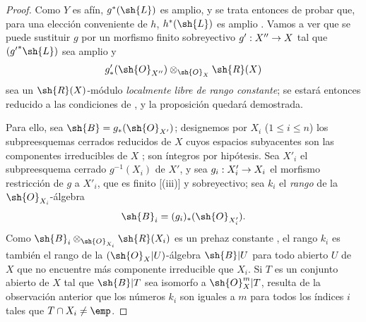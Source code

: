 \documentclass[oneside,10pt]{amsart}
\makeatletter
\renewcommand{\leq}{\leqslant}
\newcommand{\ega@arrow}[2]{\mathchoice{#1}{#2}{#2}{#2}}
\renewcommand{\to}{\ega@arrow{\longrightarrow}{\rightarrow}}
\newcommand{\oldpage}[2][]{\marginnote{\normalfont\footnotesize\textbf{#1}~|~#2}\ignorespaces}
\makeatother
\begin{document}
\begin{proof}
Como $Y$ es afín, $g^*(\sh{L})$ es amplio, y se trata entonces de probar que, para una elección conveniente de $h$, $h^*(\sh{L})$ es amplio .
Vamos a ver que se puede sustituir $g$ por un morfismo finito sobreyectivo $g':X''\to X$ tal que $({g'}^*\sh{L})$ sea amplio y
\[
  g'_*(\sh{O}_{X''})\otimes_{\sh{O}_X}\sh{R}(X)
\]
sea un $\sh{R}(X)$-módulo \emph{localmente libre de rango constante};
se estará entonces reducido a las condiciones de , y la proposición quedará demostrada.

Para ello, sea $\sh{B}=g_*(\sh{O}_{X'})$;
designemos por $X_i$ ($1\leq i\leq n$) los subpreesquemas cerrados reducidos de $X$ cuyos espacios subyacentes son las componentes irreducibles de $X$ ;
son íntegros por hipótesis.
\oldpage[II]{135}
Sea $X'_i$ el subpreesquema cerrado $g^{-1}(X_i)$ de $X'$, y sea $g_i:X'_i\to X_i$ el morfismo restricción de $g$ a $X'_i$, que es finito [(iii)] y sobreyectivo;
sea $k_i$ el \emph{rango} de la $\sh{O}_{X_i}$-álgebra
\[
  \sh{B}_i=(g_i)_*(\sh{O}_{X'_i}).
\]
Como $\sh{B}_i\otimes_{\sh{O}_{X_i}}\sh{R}(X_i)$ es un prehaz constante , el rango $k_i$ es también el rango de la $(\sh{O}_X|U)$-álgebra $\sh{B}|U$ para todo abierto $U$ de $X$ que no encuentre más componente irreducible que $X_i$.
Si $T$ es un conjunto abierto de $X$ tal que $\sh{B}|T$ sea isomorfo a $\sh{O}_X^m|T$, resulta de la observación anterior que los números $k_i$ son iguales a $m$ para todos los índices $i$ tales que $T\cap X_i\neq\emp$.


\end{proof}
\end{document}
